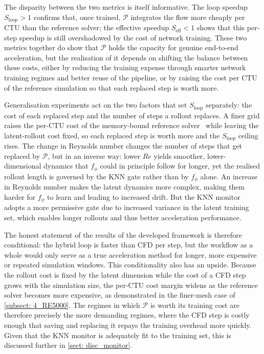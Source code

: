 The disparity between the two metrics is itself informative. The loop speedup $S_\text{loop} > 1$ confirms that, once trained, $\mathcal{P}$ integrates the flow more cheaply per CTU than the reference solver; the effective speedup $S_\text{eff} < 1$ shows that this per-step speedup is still overshadowed by the cost of network training. These two metrics together do show that $\mathcal{P}$ holds the capacity for genuine end-to-end acceleration, but the realisation of it depends on shifting the balance between these costs, either by reducing the training expense through smarter network training regimes and better reuse of the pipeline, or by raising the cost per CTU of the reference simulation so that each replaced step is worth more. 

Generalisation experiments act on the two factors that set $S_\text{loop}$ separately: the cost of each replaced step and the number of steps a rollout replaces. A finer grid raises the per-CTU cost of the memory-bound reference solver~\cite{Weymouth2025} while leaving the latent-rollout cost fixed, so each replaced step is worth more and the $S_\text{loop}$ ceiling rises. The change in Reynolds number changes the number of steps that get replaced by $\mathcal{P}$, but in an inverse way: lower $Re$ yields smoother, lower-dimensional dynamics that $f_\phi$ could in principle follow for longer, yet the realised rollout length is governed by the KNN gate rather than by $f_\phi$ alone. An increase in Reynolds number makes the latent dynamics more complex, making them harder for $f_\phi$ to learn and leading to increased drift. But the KNN monitor adopts a more permissive gate due to increased variance in the latent training set, which enables longer rollouts and thus better acceleration performance. 

The honest statement of the results of the developed framework is therefore conditional: the hybrid loop is faster than CFD per step, but the workflow as a whole would only serve as a true acceleration method for longer, more expensive or repeated simulation windows. This conditionality also has an upside. Because the rollout cost is fixed by the latent dimension while the cost of a CFD step grows with the simulation size, the per-CTU cost margin widens as the reference solver becomes more expensive, as demonstrated in the finer-mesh case of \autoref{subsect: 4_RE5000}. The regimes in which $\mathcal{P}$ is worth its training cost are therefore precisely the more demanding regimes, where the CFD step is costly enough that saving and replacing it repays the training overhead more quickly. Given that the KNN monitor is adequately fit to the training set, this is discussed further in \autoref{sect: disc_monitor}. 

